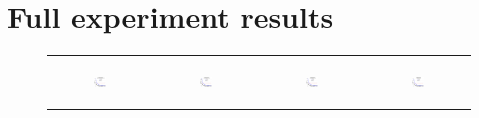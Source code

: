 \section{Full experiment results}
\label{app:exptresults}
\begin{figure}[ht]
  \centering
  \begin{tabular}{cccc}
	  \begin{subfigure}[b]{0.22\textwidth}
	  	\includegraphics[width=110pt]{images/runtime_bigsynthetic_maxgraphcut.eps}
			\caption{}
			\label{appfig:runtime_bigsynthetic_maxgraphcut}
	  \end{subfigure} &
	  \begin{subfigure}[b]{0.22\textwidth}
	  	\includegraphics[width=110pt]{images/runtime_bigsynthetic_setcover.eps}
			\caption{}
			\label{appfig:runtime_bigsynthetic_setcover}
	  \end{subfigure} &
	  \begin{subfigure}[b]{0.22\textwidth}
	  	\includegraphics[width=110pt]{images/runtime_zigzag_maxgraphcut.eps}
			\caption{}
			\label{appfig:runtime_zigzag_maxgraphcut}
	  \end{subfigure} &
	  \begin{subfigure}[b]{0.22\textwidth}
	  	\includegraphics[width=110pt]{images/runtime_zigzag_setcover.eps}

\end{subfigure}
\end{tabular}
\end{figure}
